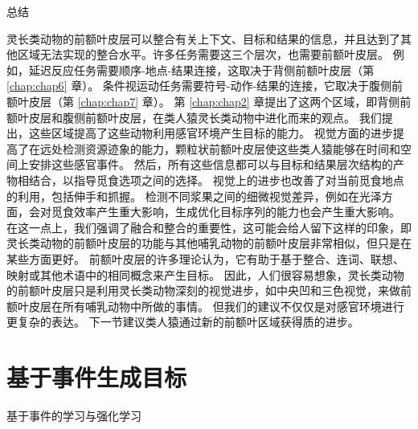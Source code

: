 总结

灵长类动物的前额叶皮层可以整合有关上下文、目标和结果的信息，并且达到了其他区域无法实现的整合水平。许多任务需要这三个层次，也需要前额叶皮层。
例如，延迟反应任务需要顺序-地点-结果连接，这取决于背侧前额叶皮层（第 \ref{chap:chap6} 章）。
条件视运动任务需要符号-动作-结果的连接，它取决于腹侧前额叶皮层（第 \ref{chap:chap7} 章）。
第 \ref{chap:chap2} 章提出了这两个区域，即背侧前额叶皮层和腹侧前额叶皮层，在类人猿灵长类动物中进化而来的观点。
我们提出，这些区域提高了这些动物利用感官环境产生目标的能力。
视觉方面的进步提高了在远处检测资源迹象的能力，颗粒状前额叶皮层使这些类人猿能够在时间和空间上安排这些感官事件。
然后，所有这些信息都可以与目标和结果层次结构的产物相结合，以指导觅食选项之间的选择。
视觉上的进步也改善了对当前觅食地点的利用，包括伸手和抓握。
检测不同浆果之间的细微视觉差异，例如在光泽方面，会对觅食效率产生重大影响，生成优化目标序列的能力也会产生重大影响。
在这一点上，我们强调了融合和整合的重要性，这可能会给人留下这样的印象，即灵长类动物的前额叶皮层的功能与其他哺乳动物的前额叶皮层非常相似，但只是在某些方面更好。
前额叶皮层的许多理论认为，它有助于基于整合、连词、联想、映射或其他术语中的相同概念来产生目标。
因此，人们很容易想象，灵长类动物的前额叶皮层只是利用灵长类动物深刻的视觉进步，如中央凹和三色视觉，来做前额叶皮层在所有哺乳动物中所做的事情。
但我们的建议不仅仅是对感官环境进行更复杂的表达。
下一节建议类人猿通过新的前额叶区域获得质的进步。



\section{基于事件生成目标}

基于事件的学习与强化学习

